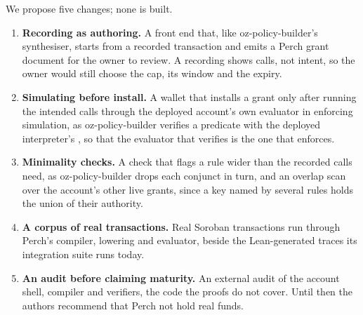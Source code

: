 We propose five changes; none is built.

\begin{enumerate}[leftmargin=*,itemsep=2pt]
\item \textbf{Recording as authoring.} A front end that, like oz-policy-builder's
synthesiser, starts from a recorded transaction and emits a Perch grant document
for the owner to review. A recording shows calls, not intent, so the owner would
still choose the cap, its window and the expiry.
\item \textbf{Simulating before install.} A wallet that installs a grant only
after running the intended calls through the deployed account's own evaluator in
enforcing simulation, as oz-policy-builder verifies a predicate with the deployed
interpreter's , so that the evaluator that verifies is the one that
enforces.
\item \textbf{Minimality checks.} A check that flags a rule wider than the
recorded calls need, as oz-policy-builder drops each conjunct in turn, and an
overlap scan over the account's other live grants, since a key named by several
rules holds the union of their authority.
\item \textbf{A corpus of real transactions.} Real Soroban transactions run
through Perch's compiler, lowering and evaluator, beside the
 Lean-generated traces its integration suite runs today.
\item \textbf{An audit before claiming maturity.} An external audit of the
account shell, compiler and verifiers, the code the proofs do not cover. Until
then the authors recommend that Perch not hold real funds.
\end{enumerate}
